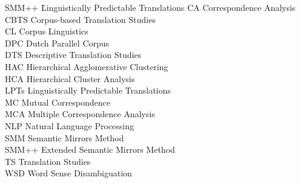 \begin{tabbing}
SMM++\hspace{1em} \= Linguistically Predictable Translations\kill
CA    \>   Correspondence Analysis                  \\
CBTS  \>   Corpus-based Translation Studies         \\
CL    \>   Corpus Linguistics                       \\
DPC   \>   Dutch Parallel Corpus                    \\
DTS   \>   Descriptive Translation Studies          \\
HAC   \>   Hierarchical Agglomerative Clustering    \\
HCA   \>   Hierarchical Cluster Analysis            \\
LPTs  \>   Linguistically Predictable Translations  \\
MC    \>   Mutual Correspondence                    \\
MCA   \>   Multiple Correspondence Analysis         \\
NLP   \>   Natural Language Processing              \\
SMM   \>   Semantic Mirrors Method                  \\
SMM++ \>   Extended Semantic Mirrors Method         \\
TS    \>   Translation Studies                      \\
WSD   \>   Word Sense Disambiguation
\end{tabbing}
